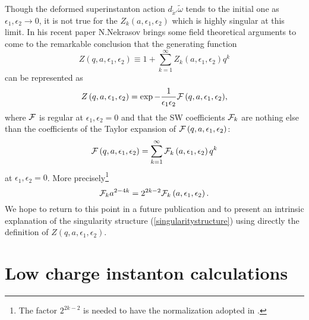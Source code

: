 \documentclass[a4paper,12pt]{article}
\begin{document}
Though the deformed superinstanton action $d_{{\tilde x}'}{\tilde
\omega}$ tends to the initial one as $\epsilon_1, \epsilon_2
\rightarrow 0$, it is not true for the $Z_k(a, \epsilon_1,
\epsilon_2)$ which is highly singular at this limit. In his recent
paper N.Nekrasov \cite{N} brings some field theoretical arguments
to come to the remarkable conclusion that the generating function
\begin{equation}
Z\left(q, a, \epsilon_1, \epsilon_2 \right)\equiv 1+\sum_{k=1}^{\infty} Z_k\left(a, \epsilon_1, \epsilon_2
\right)q^k \label{generatingZ}
\end{equation}
can be represented as
\begin{equation}
Z\left(q, a, \epsilon_1, \epsilon_2
\right)=\exp{-\frac{1}{\epsilon_1 \epsilon_2}{\cal F}\left(q, a,
\epsilon_1, \epsilon_2 \right)}, \label{singularitystructure}
\end{equation}
where ${\cal F}$ is regular at $\epsilon_1, \epsilon_2 =0$ and
that the SW coefficients ${\cal F}_k$ are nothing else than the
coefficients of the Taylor expansion of ${\cal F}\left(q, a,
\epsilon_1, \epsilon_2 \right)$:
\begin{equation}
{\cal F}\left(q, a, \epsilon_1, \epsilon_2 \right)=\sum_{k=1}^{\infty}{\cal F}_k\left(a, \epsilon_1, \epsilon_2
\right)q^k \label{TaylorF}
\end{equation}
at $\epsilon_1, \epsilon_2 =0$. More precisely\footnote{The factor
$2^{2k-2}$ is needed to have the normalization adopted in
\cite{dorey1}.}
\begin{equation}
{\cal F}_k a^{2-4k} =2^{2k-2}{\cal F}_k\left(a, \epsilon_1, \epsilon_2 \right).
\end{equation}
We hope to return to this point in a future publication and to
present an intrinsic explanation of the singularity structure
(\ref{singularitystructure}) using directly the definition of
$Z\left(q, a, \epsilon_1, \epsilon_2 \right)$.

\setcounter{equation}{0}
\section{Low charge instanton calculations}
\renewcommand{\theequation}{4.\arabic{equation}}
\end{document}
